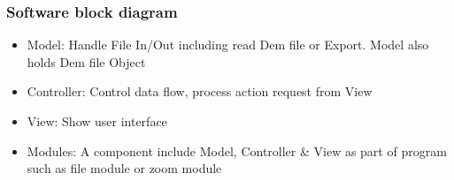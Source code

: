 \documentclass[11pt]{article}
\begin{document}
\subsubsection{Software block diagram}
\noindent{}
\begin{itemize}
\item Model: Handle File In/Out including read Dem file or Export. Model also holds Dem file Object
\item Controller: Control data flow, process action request from View
\item View: Show user interface
\item Modules: A component include Model, Controller \& View as part of program such as file module or zoom module
\end{itemize}
\end{document}
